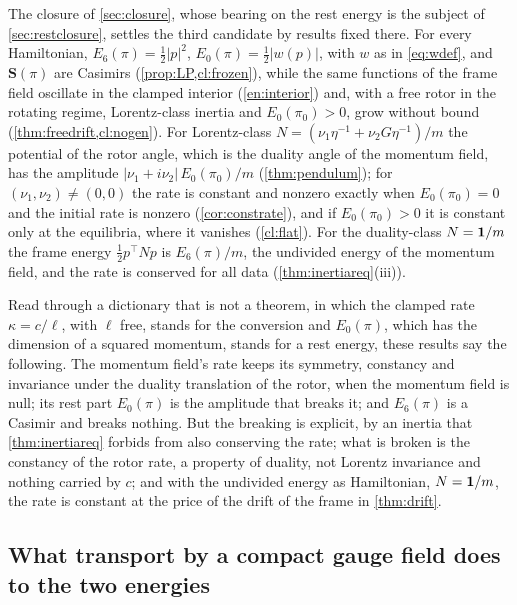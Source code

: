 \begin{remark}
\label{en:closure}
The closure of \cref{sec:closure}, whose bearing on the rest energy is the subject of \cref{sec:restclosure}, settles the third candidate by
results fixed there. For every Hamiltonian, $E_6(\pi)=\tfrac12|p|^2$, $E_0(\pi)=\tfrac12|w(p)|$, with $w$ as in \eqref{eq:wdef}, and
$\mathbf S(\pi)$ are Casimirs (\cref{prop:LP,cl:frozen}), while the same functions of the frame field oscillate in the clamped interior
(\cref{en:interior}) and, with a free rotor in the rotating regime, Lorentz-class inertia and $E_0(\pi_0)>0$, grow without bound
(\cref{thm:freedrift,cl:nogen}). For Lorentz-class $N=(\nu_1\eta^{-1}+\nu_2G\eta^{-1})/m$ the potential of the rotor angle, which is the
duality angle of the momentum field, has the amplitude $|\nu_1+i\nu_2|\,E_0(\pi_0)/m$ (\cref{thm:pendulum}); for $(\nu_1,\nu_2)\neq(0,0)$ the
rate is constant and nonzero exactly when $E_0(\pi_0)=0$ and the initial rate is nonzero (\cref{cor:constrate}), and if $E_0(\pi_0)>0$ it is
constant only at the equilibria, where it vanishes (\cref{cl:flat}). For the duality-class $N=\mathbf 1/m$ the frame energy
$\tfrac12p^{\!\top}Np$ is $E_6(\pi)/m$, the undivided energy of the momentum field, and the rate is conserved for all data
(\cref{thm:inertiareq}(iii)).
\end{remark}

Read through a dictionary that is not a theorem, in which the clamped rate $\kappa=c/\ell$, with $\ell$ free, stands for the conversion and
$E_0(\pi)$, which has the dimension of a squared momentum, stands for a rest energy, these results say the following. The momentum field's rate keeps its symmetry, constancy and invariance under the duality translation of the rotor, when the momentum
field is null; its rest part $E_0(\pi)$ is the amplitude that breaks it; and $E_6(\pi)$ is a Casimir and breaks nothing. But the breaking is explicit,
by an inertia that \cref{thm:inertiareq} forbids from also conserving the rate; what is broken is the constancy of the rotor rate, a property of
duality, not Lorentz invariance and nothing carried by $c$; and with the undivided energy as Hamiltonian, $N=\mathbf 1/m$, the rate is constant at the
price of the drift of the frame in \cref{thm:drift}.

\subsection{What transport by a compact gauge field does to the two energies}
\label{sec:energy-transport}

